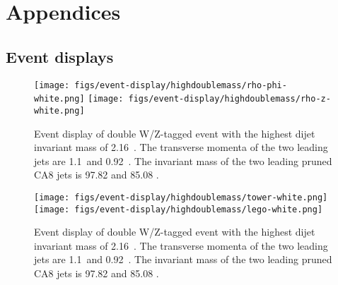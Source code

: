 \section{Appendices}

\subsection{Event displays}


\begin{figure}[htb]
\begin{center}
\texttt{[image: figs/event-display/highdoublemass/rho-phi-white.png]}
\texttt{[image: figs/event-display/highdoublemass/rho-z-white.png]}
\end{center}
\caption{Event display of double W/Z-tagged event with the highest dijet invariant mass of 2.16~\TeVcc .
The transverse momenta of the two leading jets are 1.1~\TeVcc and 0.92~\TeVcc .
The invariant mass of the two leading pruned CA8 jets is 97.82 \GeVcc and 85.08 \GeVcc .
}
\label{fig:eventdisplay1}
\end{figure}

\begin{figure}[htb]
\begin{center}
\texttt{[image: figs/event-display/highdoublemass/tower-white.png]}
\texttt{[image: figs/event-display/highdoublemass/lego-white.png]}
\end{center}
\caption{Event display of double W/Z-tagged event with the highest dijet invariant mass of 2.16~\TeVcc .
The transverse momenta of the two leading jets are 1.1~\TeVcc and 0.92~\TeVcc .
The invariant mass of the two leading pruned CA8 jets is 97.82 \GeVcc and 85.08 \GeVcc .
}
\label{fig:eventdisplay2}
\end{figure}

